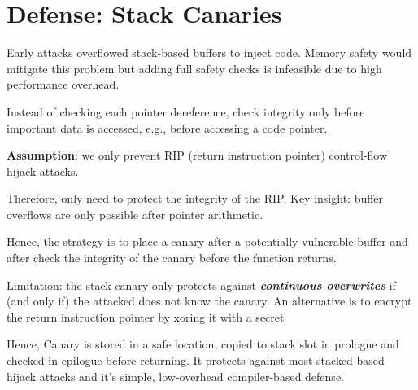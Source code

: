 \documentclass[11pt]{article}
\begin{document}
\section*{Defense: Stack Canaries}

Early attacks overflowed stack-based buffers to inject code. Memory safety would mitigate this problem but adding full safety checks is infeasible due to high performance overhead. 

Instead of checking each pointer dereference, check integrity only before important data is accessed, e.g., before accessing a code pointer. 

\textbf{Assumption}: we only prevent RIP (return instruction pointer) control-flow hijack attacks. 

Therefore, only need to protect the integrity of the RIP. Key insight: buffer overflows are only possible after pointer arithmetic. 

Hence, the strategy is to place a canary after a potentially vulnerable buffer and after check the integrity of the canary before the function returns. 

Limitation: the stack canary only protects against \textbf{\textit{continuous overwrites}} if (and only if) the attacked does not know the canary. An alternative is to encrypt the return instruction pointer by xoring it with a secret

Hence, Canary is stored in a safe location, copied to stack slot in prologue and checked in epilogue before returning. It protects against most stacked-based hijack attacks and it's simple, low-overhead compiler-based defense. 
\end{document}
